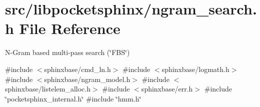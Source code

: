 \section{src/libpocketsphinx/ngram\+\_\+search.h File Reference}
\label{ngram__search_8h}


N-\/\+Gram based multi-\/pass search (\char`\"{}\+F\+B\+S\char`\"{})  


{\ttfamily \#include $<$sphinxbase/cmd\+\_\+ln.\+h$>$}\newline
{\ttfamily \#include $<$sphinxbase/logmath.\+h$>$}\newline
{\ttfamily \#include $<$sphinxbase/ngram\+\_\+model.\+h$>$}\newline
{\ttfamily \#include $<$sphinxbase/listelem\+\_\+alloc.\+h$>$}\newline
{\ttfamily \#include $<$sphinxbase/err.\+h$>$}\newline
{\ttfamily \#include \char`\"{}pocketsphinx\+\_\+internal.\+h\char`\"{}}\newline
{\ttfamily \#include \char`\"{}hmm.\+h\char`\"{}}\newline
